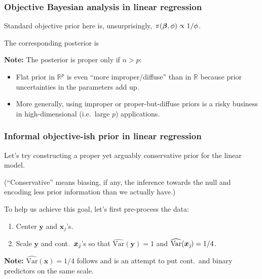 \documentclass[18pt]{beamer}
\newcommand{\defineTightItemizeSpacing}{%
	\setlength{\abovedisplayskip}{.25\baselineskip}%
	\setlength{\belowdisplayskip}{.25\baselineskip}%
}
\newenvironment{tightEquation*}{%
	\defineTightItemizeSpacing%
	\begin{equation*}
}{
	\end{equation*} \ignorespacesafterend
}
\newenvironment{narrowItemize}[1][]{%
  \vspace{-.3\baselineskip}%
  \begin{itemize}[#1]
  \addtolength\itemsep{-.1\baselineskip}
}{
  \end{itemize}
}
\newenvironment{narrowEnumerate}[1][1.]{%
  \vspace{-.3\baselineskip}%
  \begin{enumerate}[#1]
  \addtolength\itemsep{-.1\baselineskip}
}{
  \end{enumerate}
}
\newcommand{\given}{\thinnerspace | \thinnerspace}
\newcommand{\transpose}{\text{\raisebox{.5ex}{$\intercal$}}}
\newcommand{\thinnerspace}{\mskip.5\thinmuskip}
\newcommand{\variance}{\mathrm{Var}}
\newcommand{\normalDist}{\mathcal{N}}
\newcommand{\gammaDist}{\mathrm{Gamma}}
\newcommand{\mle}[1]{\widehat{#1}_{\textrm{mle}}}
\newcommand{\nPred}{p}
\newcommand{\density}{\pi}
\newcommand{\by}{\bm{y}}
\newcommand{\bx}{\bm{x}}
\newcommand{\bX}{\bm{X}}
\newcommand{\bXGramMat}{\bX^\transpose \mskip-.7\thinmuskip \bX}
\newcommand{\bbeta}{\bm{\beta}}
\begin{document}
\begin{frame}
\frametitle{Objective Bayesian analysis in linear regression}
Standard objective prior here is, unsurprisingly, $\thinnerspace \density(\bbeta, \phi) \propto 1 / \phi$.

\pause
The corresponding posterior is
\begin{tightEquation*}
\end{tightEquation*}

\pause
\textbf{Note:} The posterior is proper only if $n > \nPred$:
\begin{narrowItemize}[<+->]
\item Flat prior in $\mathbb{R}^\nPred$ is even ``more improper/diffuse'' than in $\mathbb{R}$ because prior uncertainties in the parameters add up.
\item More generally, using improper or proper-but-diffuse priors is a risky business in high-dimensional (i.e.\ large $\nPred$) applications.
\end{narrowItemize}
\end{frame}


\begin{frame}
\frametitle{Informal objective-ish prior in linear regression}
Let's try constructing a proper yet arguably conservative prior for the linear model.

\pause
(``Conservative'' means biasing, if any, the inference towards the null and encoding less prior information than we actually have.)

\pause
To help us achieve this goal, let's first pre-process the data:
\begin{narrowEnumerate}
\item Center $\bm{y}$ and $\bx_j$'s. %
\item Scale $\bm{y}$ and cont.\ $\bx_j\mkern-1mu$'s so that $\widehat{\variance}(\by) = 1$ and $\widehat{\variance}(\bx_j \mkern-2mu) = 1/4$.%
\end{narrowEnumerate}

\pause
\textbf{Note:} $\widehat{\variance}(\bx) = 1/4$ follows \citet{gelman2008default_prior} and is an attempt to put cont.\ and binary predictors on the same scale. 
\end{frame}
\end{document}
